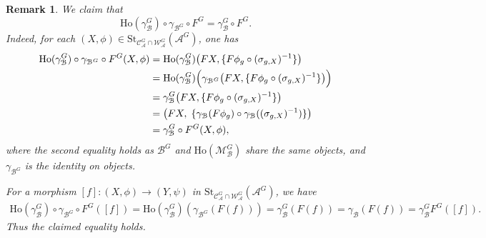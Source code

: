 \documentclass[12pt,twoside]{amsart}
\theoremstyle{bfupright head,slanted body}
\theoremstyle{bfupright head,upright body}
\theoremstyle{fixed bf head,slanted body}
\theoremstyle{fixed bf head,upright body}
\newtheorem{rmk}[res]{Remark}           \newtheorem*{rmk*}{Remark}
\theoremstyle{numbered paragraph}
\numberwithin{equation}{res}
\newcommand{\calC}{\mathcal{C}}
\newcommand{\calW}{\mathcal{W}}
\newcommand{\calA}{\mathcal{A}}
\newcommand{\calB}{\mathcal{B}}
\newcommand{\calM}{\mathcal{M}}
\newcommand{\Ho}{\mathrm{Ho}}
\newcommand{\St}{\mathrm{St}}
\begin{document}
\begin{rmk}
We claim that
\[
\Ho(\gamma_\calB^G) \circ \gamma_{\calB^G} \circ F^G = \gamma_\calB^G\circ F^G.
\]
Indeed, for each $(X,\phi) \in \St_{\calC_\calA^G \cap \calW_\calA^G}(\calA^G)$, one has
\begin{align*}
\Ho(\gamma_\calB^G) \circ \gamma_{\calB^G}\circ F^G(X,\phi)
&= \Ho(\gamma_\calB^G)\bigl(FX,\{F\phi_g \circ (\sigma_{g,X})^{-1}\}\bigr) \\
&= \Ho(\gamma_\calB^G)\Bigl(\gamma_{\calB^G}\bigl(FX,\{F\phi_g \circ (\sigma_{g,X})^{-1}\}\bigr)\Bigr) \\
&= \gamma_\calB^G\bigl(FX,\{F\phi_g \circ (\sigma_{g,X})^{-1}\}\bigr) \\
&= \bigl(FX,\;\{\gamma_\calB(F\phi_g) \circ \gamma_\calB((\sigma_{g,X})^{-1})\}\bigr) \\
&= \gamma_\calB^G\circ F^G(X,\phi),
\end{align*}
where the second equality holds as $\calB^G$ and $\Ho(\calM_{\calB}^G)$ share the same objects, and $\gamma_{\calB^G}$ is the identity on objects.

For a morphism $[f] : (X, \phi) \to (Y, \psi)$ in $\St_{\calC_\calA^G \cap \calW_\calA^G}(\calA^G)$, we have
\begin{align*}
   \Ho(\gamma_\calB^G) \circ \gamma_{\calB^G}\circ F^G([f])
=  \Ho(\gamma_\calB^G)(\gamma_{\calB^G}(F(f)))
=  \gamma_\calB^G(F(f))
=  \gamma_\calB(F(f))
=  \gamma_\calB^G  F^G([f]).
\end{align*}
Thus the claimed equality holds.
\end{rmk}
\end{document}
